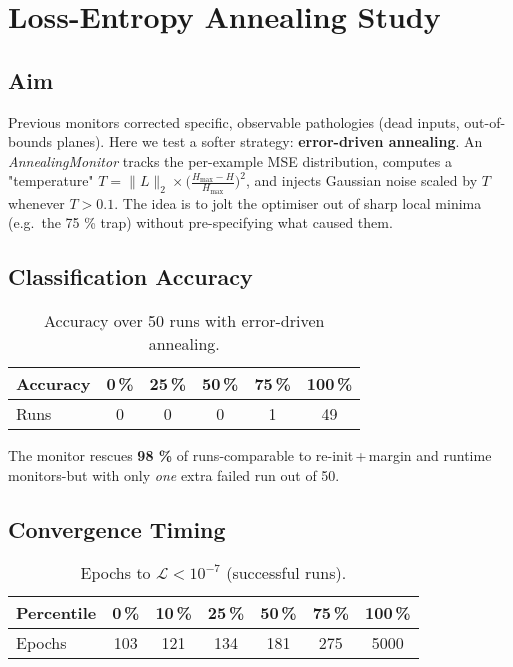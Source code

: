 \section{Loss-Entropy Annealing Study}
\label{sec:relu1-annealing}

\subsection*{Aim}
Previous monitors corrected specific, observable pathologies (dead inputs,
out-of-bounds planes).  
Here we test a softer strategy: \textbf{error-driven annealing}.
An \emph{AnnealingMonitor} tracks the per-example MSE distribution,
computes a "temperature"
\(T = \lVert\!L\!\rVert_2 \times \bigl(\!\tfrac{H_{\max}-H}{H_{\max}}\bigr)^2\),
and injects Gaussian noise scaled by \(T\) whenever
\(T > 0.1\).
The idea is to jolt the optimiser out of sharp local minima
(e.g.\ the 75 \% trap) without pre-specifying what caused them.

\subsection*{Classification Accuracy}

\begin{table}[ht]
\centering
\caption{Accuracy over 50 runs with error-driven annealing.}
\label{tab:relu1-anneal-accuracy}
\begin{tabular}{lccccc}
\toprule
Accuracy & 0\,\% & 25\,\% & 50\,\% & 75\,\% & 100\,\% \\
\midrule
Runs & 0 & 0 & 0 & 1 & 49 \\
\bottomrule
\end{tabular}
\end{table}

The monitor rescues \textbf{98 \%} of runs-comparable to
re-init\,+\,margin and runtime monitors-but with only \emph{one} extra
failed run out of 50.

\subsection*{Convergence Timing}

\begin{table}[ht]
\centering
\caption{Epochs to $\mathcal L<10^{-7}$ (successful runs).}
\label{tab:relu1-anneal-epochs}
\begin{tabular}{lcccccc}
\toprule
Percentile & 0\,\% & 10\,\% & 25\,\% & 50\,\% & 75\,\% & 100\,\% \\ \midrule
Epochs & 103 & 121 & 134 & 181 & 275 & 5000 \\
\bottomrule
\end{tabular}
\end{table}

